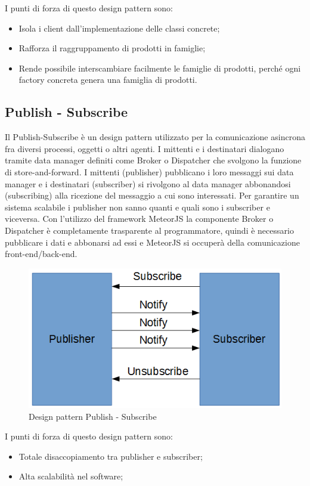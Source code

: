 I punti di forza di questo design pattern sono:
\begin{itemize}
	\item Isola i client dall’implementazione delle classi concrete;
	\item Rafforza il raggruppamento di prodotti in famiglie;
	\item Rende possibile interscambiare facilmente le famiglie di prodotti, perché ogni factory concreta genera una famiglia di prodotti.
\end{itemize}


\subsection{Publish - Subscribe}
Il Publish-Subscribe è un design pattern utilizzato per la comunicazione asincrona fra diversi processi, oggetti o altri agenti. I mittenti e i destinatari dialogano tramite data manager definiti come Broker o Dispatcher che svolgono la funzione di store-and-forward.
I mittenti (publisher) pubblicano i loro messaggi sui data manager e i destinatari (subscriber) si rivolgono al data manager abbonandosi (subscribing) alla ricezione del messaggio a cui sono interessati. Per garantire un sistema scalabile i publisher non sanno quanti e quali sono i subscriber e viceversa. 
Con l'utilizzo del framework MeteorJS la componente Broker o Dispatcher è completamente trasparente al programmatore, quindi è necessario pubblicare i dati e abbonarsi ad essi e MeteorJS si occuperà della comunicazione front-end/back-end.
\begin{figure}[H]
	\centering
	\includegraphics[width=0.5\linewidth]{IMG/pubsub}
	\caption{Design pattern Publish - Subscribe}
\end{figure}

I punti di forza di questo design pattern sono:
\begin{itemize}
	\item Totale disaccopiamento tra publisher e subscriber;
	\item Alta scalabilità nel software;
\end{itemize}



